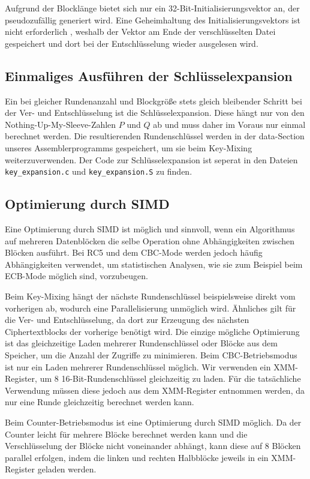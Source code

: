 \documentclass[course=erap]{aspdoc}
\begin{document}
Aufgrund der Blocklänge bietet sich nur ein 32-Bit-Initialisierungsvektor an, der pseudozufällig generiert wird.
Eine Geheimhaltung des Initialisierungsvektors ist nicht erforderlich \cite[p.194]{appcrypt}, weshalb der Vektor am Ende der verschlüsselten Datei gespeichert und dort bei der Entschlüsselung wieder ausgelesen wird.

\subsection{Einmaliges Ausführen der Schlüsselexpansion}
Ein bei gleicher Rundenanzahl und Blockgröße stets gleich bleibender Schritt bei der Ver- und Entschlüsselung ist die Schlüsselexpansion. Diese hängt nur von den Nothing-Up-My-Sleeve-Zahlen $P$ und $Q$ ab und muss daher im Voraus nur einmal berechnet werden. Die resultierenden Rundenschlüssel werden in der data-Section unseres Assemblerprogramms gespeichert, um sie beim Key-Mixing weiterzuverwenden. Der Code zur Schlüsselexpansion ist seperat in den Dateien \texttt{key\_expansion.c} und \texttt{key\_expansion.S} zu finden.

\subsection{Optimierung durch SIMD}
Eine Optimierung durch SIMD ist möglich und sinnvoll, wenn ein Algorithmus auf mehreren Datenblöcken die selbe Operation ohne Abhängigkeiten zwischen Blöcken ausführt. Bei RC5 und dem CBC-Mode werden jedoch häufig Abhängigkeiten verwendet, um statistischen Analysen, wie sie zum Beispiel beim ECB-Mode möglich sind, vorzubeugen.\bigbreak

Beim Key-Mixing hängt der nächste Rundenschlüssel beispielsweise direkt vom vorherigen ab, wodurch eine Parallelisierung unmöglich wird.
Ähnliches gilt für die Ver- und Entschlüsselung, da dort zur Erzeugung des nächsten Ciphertextblocks der vorherige benötigt wird. Die einzige mögliche Optimierung ist das gleichzeitige Laden mehrerer Rundenschlüssel oder Blöcke aus dem Speicher, um die Anzahl der Zugriffe zu minimieren. Beim CBC-Betriebsmodus ist nur ein Laden mehrerer Rundenschlüssel möglich. Wir verwenden ein XMM-Register, um 8 16-Bit-Rundenschlüssel gleichzeitig zu laden. Für die tatsächliche Verwendung müssen diese jedoch aus dem XMM-Register entnommen werden, da nur eine Runde gleichzeitig berechnet werden kann.\bigbreak

Beim Counter-Betriebsmodus ist eine Optimierung durch SIMD möglich. Da der Counter leicht für mehrere Blöcke berechnet werden kann und die Verschlüsselung der Blöcke nicht voneinander abhängt, kann diese auf 8 Blöcken parallel erfolgen, indem die linken und rechten Halbblöcke jeweils in ein XMM-Register geladen werden.
\end{document}
